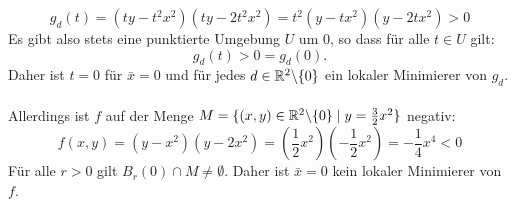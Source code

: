 \begin{compactenum}[(i)]
 \begin{displaymath}
   g_d(t)=(ty-t^2x^2)(ty-2t^2x^2)=t^2(y-tx^2)(y-2tx^2)>0
 \end{displaymath}
Es gibt also stets eine punktierte Umgebung $U$ um $0$, so dass für alle $t\in U$ gilt:
 \begin{displaymath}
  g_d(t)>0=g_d(0).
 \end{displaymath}
Daher ist $t=0$ für $\bar x=0$ und für jedes $d\in\mathbb{R}^2\backslash\{0\}$ ein lokaler Minimierer von $g_d$.\\\\ Allerdings ist $f$ auf der Menge $M=\{(x,y)\in\mathbb{R}^2\backslash \{0\}\mid y=\frac{3}{2}x^2\}$ negativ:
$$f(x,y)=(y-x^2)(y-2x^2)=\left(\frac{1}{2}x^2\right)\left(-\frac{1}{2}x^2\right)=-\frac{1}{4}x^4<0$$
Für alle $r>0$ gilt $B_r(0)\cap M\neq\emptyset$. Daher ist $\bar x=0$ kein lokaler Minimierer von $f$.
\end{compactenum}
